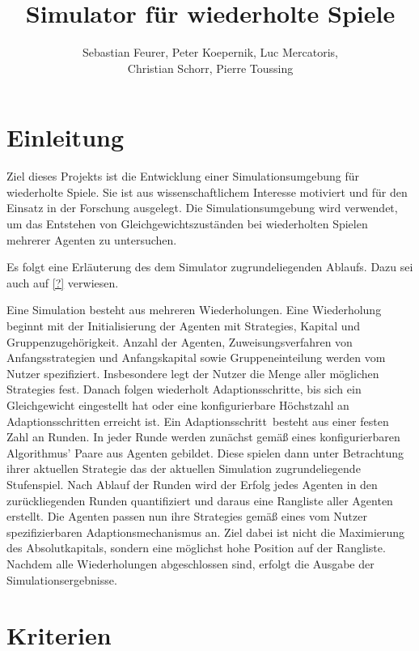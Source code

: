 \documentclass[parskip=full,11pt]{scrartcl}
\title{Simulator für wiederholte Spiele}
\author{Sebastian Feurer, Peter Koepernik, Luc Mercatoris,\\Christian Schorr, Pierre Toussing}
\def\adapt{Adaptionsschritt}
\def\adapts{Adaptionsschritte}
\begin{document}
\maketitle

\section{Einleitung}

Ziel dieses Projekts ist die Entwicklung einer Simulationsumgebung für wiederholte Spiele. Sie ist aus wissenschaftlichem Interesse motiviert und für den Einsatz in der Forschung ausgelegt. Die Simulationsumgebung wird verwendet, um das Entstehen von Gleichgewichtszuständen bei wiederholten Spielen mehrerer Agenten zu untersuchen.

Es folgt eine Erläuterung des dem Simulator zugrundeliegenden Ablaufs. Dazu sei auch auf \cref{?} verwiesen.

Eine Simulation besteht aus mehreren Wiederholungen. Eine Wiederholung beginnt mit der Initialisierung der Agenten mit \Glspl{Strategie}, Kapital und Gruppenzugehörigkeit. Anzahl der Agenten, Zuweisungsverfahren von Anfangsstrategien und Anfangskapital sowie Gruppeneinteilung werden vom \Gls{Nutzer} spezifiziert. Insbesondere legt der \Gls{Nutzer} die Menge aller möglichen \Glspl{Strategie} fest. Danach folgen wiederholt \adapts, bis sich ein Gleichgewicht eingestellt hat oder eine konfigurierbare Höchstzahl an \adapts n erreicht ist. Ein \adapt\ besteht aus einer festen Zahl an Runden. In jeder Runde werden zunächst gemäß eines konfigurierbaren Algorithmus' Paare aus Agenten gebildet. Diese spielen dann unter Betrachtung ihrer aktuellen \Gls{Strategie} das der aktuellen Simulation zugrundeliegende Stufenspiel. Nach Ablauf der Runden wird der Erfolg jedes Agenten in den zurückliegenden Runden quantifiziert und daraus eine Rangliste aller Agenten erstellt. Die Agenten passen nun ihre \Glspl{Strategie} gemäß eines vom \Gls{Nutzer} spezifizierbaren Adaptionsmechanismus an. Ziel dabei ist nicht die Maximierung des Absolutkapitals, sondern eine möglichst hohe Position auf der Rangliste.\newline
Nachdem alle Wiederholungen abgeschlossen sind, erfolgt die Ausgabe der Simulationsergebnisse.

\pagebreak
\section{Kriterien}
\end{document}
